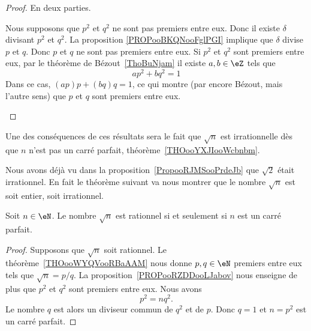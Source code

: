 \begin{proof}
    En deux parties.
    \begin{subproof}
        \spitem[\( \Rightarrow\)]
        Nous supposons que \( p^2\) et \( q^2\) ne sont pas premiers entre eux. Donc il existe \( \delta\) divisant \( p^2\) et \( q^2\). La proposition \ref{PROPooBKQNooFglPGI} implique que \( \delta\) divise \( p\) et \( q\). Donc \( p\) et \( q\) ne sont pas premiers entre eux.
        \spitem[\( \Leftarrow\)]
	Si \( p^2\) et \( q^2\) sont premiers entre eux, par le théorème de Bézout~\ref{ThoBuNjam} il existe \( a,b\in \eZ\) tels que
	\begin{equation}
		ap^2+bq^2=1
	\end{equation}
	Dans ce cas, \( (ap)p+(bq)q=1\), ce qui montre (par encore Bézout, mais l'autre sens) que \( p\) et \( q\) sont premiers entre eux.
    \end{subproof}
\end{proof}

Une des conséquences de ces résultats sera le fait que \( \sqrt{n}\) est irrationnelle dès que \( n\) n'est pas un carré parfait, théorème~\ref{THOooYXJIooWcbnbm}.

Nous avons déjà vu dans la proposition~\ref{PropooRJMSooPrdeJb} que \( \sqrt{2}\) était irrationnel. En fait le théorème suivant va nous montrer que le nombre \( \sqrt{ n }\) est soit entier, soit irrationnel.
\begin{theorem}     \label{THOooYXJIooWcbnbm}
	Soit \( n\in \eN\). Le nombre \( \sqrt{n}\) est rationnel si et seulement si \( n\) est un carré parfait.
\end{theorem}

\begin{proof}
	Supposons que \( \sqrt{n}\) soit rationnel. Le théorème~\ref{THOooWYQVooRBaAAM} nous donne \( p,q\in \eN\) premiers entre eux tels que \( \sqrt{n}=p/q\). La proposition~\ref{PROPooRZDDooLJabov} nous enseigne de plus que \( p^2\) et \( q^2\) sont premiers entre eux. Nous avons
	\begin{equation}
		p^2=nq^2.
	\end{equation}
	Le nombre \( q\) est alors un diviseur commun de \( q^2\) et de \( p\). Donc \( q=1\) et \( n=p^2\) est un carré parfait.
\end{proof}

